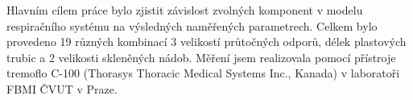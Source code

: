 Hlavním cílem práce bylo zjistit závislost zvolných komponent v modelu respiračního systému na výsledných naměřených parametrech.  Celkem bylo provedeno 19 různých kombinací 3 velikostí průtočných odporů, délek plastových trubic a 2 velikosti skleněných nádob. Měření jsem realizovala pomocí přístroje tremoflo C-100 (Thorasys Thoracic Medical Systems Inc., Kanada) v laboratoři FBMI ČVUT v Praze.